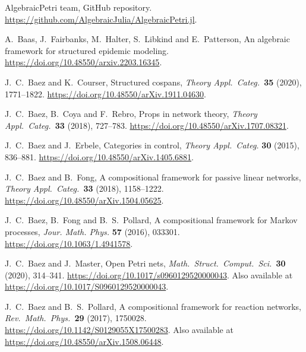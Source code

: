 \documentclass[a4paper,onecolumn, superscriptaddress,10pt, accepted=2022-03-25, issue=SS, volume=VV, shorttitle=papers/compositionality-VV-SS]{compositionalityarticle}
\begin{document}
\begin{thebibliography}{100}

 AlgebraicPetri team, GitHub repository. 
\href{https://github.com/AlgebraicJulia/AlgebraicPetri.jl}{https://github.com/AlgebraicJulia/AlgebraicPetri.jl}.

  A.\ Baas, J.\ Fairbanks, M.\ Halter, S.\ Libkind and E.\ Patterson, An
algebraic framework for structured epidemic modeling.  \href{https://doi.org/10.48550/arxiv.2203.16345}{https://doi.org/10.48550/arxiv.2203.16345}.

 J.\ C.\ Baez and K.\ Courser, Structured cospans,  \textsl{Theory Appl.\ Categ.\ }\textbf{35} (2020), 1771--1822.    	\href{https://doi.org/10.48550/arXiv.1911.04630}{https://doi.org/10.48550/arXiv.1911.04630}.

 J.\ C.\ Baez, B.\ Coya and F.\ Rebro, Props in network theory, \textsl{Theory Appl.\ Categ.\ }\textbf{33} (2018), 727--783.    	\href{https://doi.org/10.48550/arXiv.1707.08321}{https://doi.org/10.48550/arXiv.1707.08321}.

 J.\ C.\ Baez and J.\ Erbele, Categories in control, \textsl{Theory Appl.\ Categ.} {\bf 30} (2015), 836--881.  \href{https://doi.org/10.48550/arXiv.1405.6881}{https://doi.org/10.48550/arXiv.1405.6881}.

  J.\ C.\ Baez and B.\ Fong, A compositional framework for passive linear networks, \textsl{Theory Appl.\ Categ.\ }\textbf{33} (2018), 1158--1222.  \href{https://doi.org/10.48550/arXiv.1504.05625}{https://doi.org/10.48550/arXiv.1504.05625}.

 J.\ C.\ Baez, B.\ Fong and B.\ S.\ Pollard, A compositional framework for Markov processes, \textsl{Jour. Math. Phys.} \textbf{57} (2016), 033301. 
\href{https://doi.org/10.1063/1.4941578}{https://doi.org/10.1063/1.4941578}. 

  J.\ C.\ Baez and J.\ Master, Open Petri nets, \textsl{Math.\ Struct.\ Comput.\ Sci.\ }\textbf{30} (2020), 314--341.  \href{https://doi.org/10.1017/s0960129520000043}{https://doi.org/10.1017/s0960129520000043}.
Also available at
\href{https://doi.org/10.1017/S0960129520000043}{https://doi.org/10.1017/S0960129520000043}. 

 J.\ C.\ Baez and B.\ S.\ Pollard, A compositional framework for reaction networks, \textsl{Rev.\ Math.\ Phys.\ }\textbf{29} 
(2017), 1750028. \href{https://doi.org/10.1142/S0129055X17500283}{https://doi.org/10.1142/S0129055X17500283}.   Also available at 
\href{https://doi.org/10.48550/arXiv.1508.06448}{https://doi.org/10.48550/arXiv.1508.06448}.


\end{thebibliography}
\end{document}
